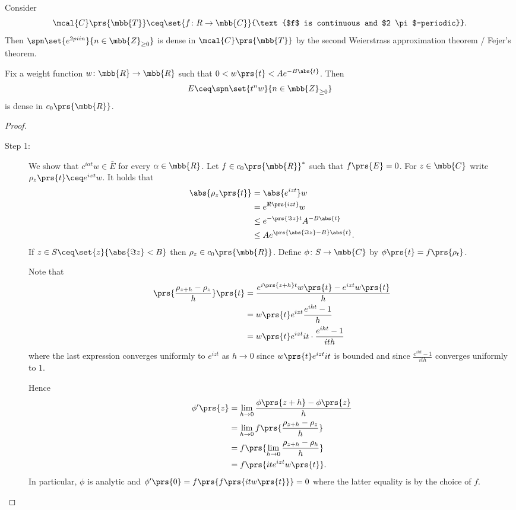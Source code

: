 \documentclass[10pt, twoside]{book}
\begin{document}
\begin{example}
Consider \[\mcal{C}\prs{\mbb{T}} \ceq \set{f \colon R \to \mbb{C}}{\text{$f$ is continuous and $2 \pi$-periodic}} \text{.}\]
Then $\spn\set{e^{2 pi i n}}{n \in \mbb{Z}_{\geq 0}}$ is dense in $\mcal{C}\prs{\mbb{T}}$ by the second Weierstrass approximation theorem / Fejer's theorem.
\end{example}

\begin{theorem}
Fix a weight function $w \colon \mbb{R} \to \mbb{R}$ such that $0 < w\prs{t} < A e^{-B \abs{t}}$.
Then
\[E \ceq \spn\set{t^n w}{n \in \mbb{Z}_{\geq 0}}\]
is dense in $c_0\prs{\mbb{R}}$.
\end{theorem}

\begin{proof}
\begin{description}
\item[Step 1:]

We show that $c^{i \alpha t}w \in \bar{E}$ for every $\alpha \in \mbb{R}$.
Let $f \in c_0\prs{\mbb{R}}^*$ such that $f\prs{E} = 0$. For $z \in \mbb{C}$ write $\rho_z\prs{t} \ceq e^{i z t} w$.
It holds that
\begin{align*}
\abs{\rho_z\prs{t}} &= \abs{e^{i z t}}w
\\&=
e^{\Re\prs{i z t}} w
\\&\leq
e^{-\prs{\Im z}t} A^{- B \abs{t}}
\\&\leq
A e^{\prs{\abs{\Im z} - B}\abs{t}} \text{.}
\end{align*}
If $z \in S \ceq \set{z}{\abs{\Im z} < B}$ then $\rho_z \in c_0\prs{\mbb{R}}$. Define $\phi \colon S \to \mbb{C}$ by $\phi\prs{t} = f\prs{\rho_t}$.

Note that
\begin{align*}
\prs{\frac{\rho_{z+h} - \rho_z}{h}}\prs{t} &= \frac{e^{i\prs{z+h} t} w\prs{t} - e^{izt} w\prs{t}}{h}
\\&=
w\prs{t} e^{i z t} \frac{e^{iht} - 1}{h}
\\&=
w\prs{t} e^{i z t} it \cdot \frac{e^{iht} - 1}{ith}
\end{align*}
where the last expression converges uniformly to $e^{izt}$ as $h \to 0$ since $w\prs{t} e^{i z t} it$ is bounded and since $\frac{e^{iht} - 1}{ith}$ converges uniformly to $1$.

Hence
\begin{align*}
\phi'\prs{z}
&=
\lim_{h \to 0} \frac{\phi\prs{z+h} - \phi\prs{z}}{h}
\\&=
\lim_{h \to 0} f\prs{\frac{\rho_{z + h} - \rho_z}{h}}
\\&=
f \prs{\lim_{h \to 0} \frac{\rho_{z+h} - \rho_h}{h}}
\\&=
f\prs{it e^{izt} w\prs{t}} \text{.}
\end{align*}
In particular, $\phi$ is analytic and $\phi'\prs{0} = f\prs{f\prs{it w\prs{t}}} = 0$ where the latter equality is by the choice of $f$.


\end{description}
\end{proof}
\end{document}
